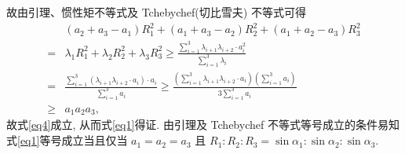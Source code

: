 故由引理、惯性矩不等式及 Tchebychef(切比雪夫) 不等式可得
$$
\begin{aligned}
& \left(a_2+a_3-a_1\right) R_1^2+\left(a_1+a_3-a_2\right) R_2^2+\left(a_1+a_2-a_3\right) R_3^2 \\
= & \lambda_1 R_1^2+\lambda_2 R_2^2+\lambda_3 R_3^2 \geqslant \frac{\sum_{i=1}^3 \lambda_{i+1} \lambda_{i+2} \cdot a_i^2}{\sum_{i=1}^3 \lambda_i} \\
= & \frac{\sum_{i=1}^3\left(\lambda_{i+1} \lambda_{i+2} \cdot a_i\right) \cdot a_i}{\sum_{i=1}^3 a_i} \geqslant \frac{\left(\sum_{i=1}^3 \lambda_{i+1} \lambda_{i+2} \cdot a_i\right)\left(\sum_{i=1}^3 a_i\right)}{3 \sum_{i=1}^3 a_i} \\
\geqslant & a_1 a_2 a_3,
\end{aligned}
$$
故式\ref{eq4}成立, 从而式\ref{eq1}得证.
由引理及 Tchebychef 不等式等号成立的条件易知式\ref{eq1}等号成立当且仅当 $a_1=a_2=a_3$ 且 $R_1: R_2: R_3=\sin \alpha_1: \sin \alpha_2: \sin \alpha_3$.


